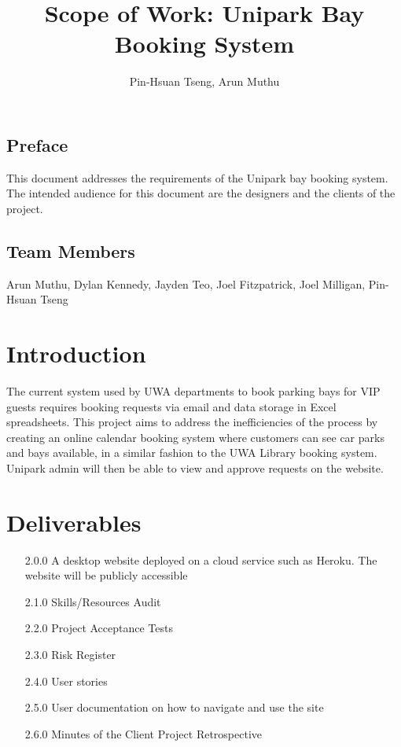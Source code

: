 \documentclass[a4paper, draft]{article}
\author{Pin-Hsuan Tseng, Arun Muthu}
\title{Scope of Work: Unipark Bay Booking System}
\begin{document}
\maketitle

\subsection*{Preface}
This document addresses the requirements of the Unipark bay booking system.
The intended audience for this document are the designers and the clients of the project.

\subsection*{Team Members}
Arun Muthu, Dylan Kennedy, Jayden Teo, Joel Fitzpatrick, Joel Milligan, Pin-Hsuan Tseng

\section{Introduction}
The current system used by UWA departments to book parking bays for
VIP guests requires booking requests via email and data storage in
Excel spreadsheets. This project aims to address the inefficiencies
of the process by creating an online calendar booking system where
customers can see car parks and bays available, in a similar fashion
to the UWA Library booking system. Unipark admin will then be able
to view and approve requests on the website.

\section{Deliverables}
\begin{itemize}
    \item [2.0.0] A desktop website deployed on a cloud service such as Heroku.
          The website will be publicly accessible
    \item [2.1.0] Skills/Resources Audit
    \item [2.2.0] Project Acceptance Tests
    \item [2.3.0] Risk Register
    \item [2.4.0] User stories
    \item [2.5.0] User documentation on how to navigate and use the site
    \item [2.6.0] Minutes of the Client Project Retrospective
\end{itemize}
\end{document}
